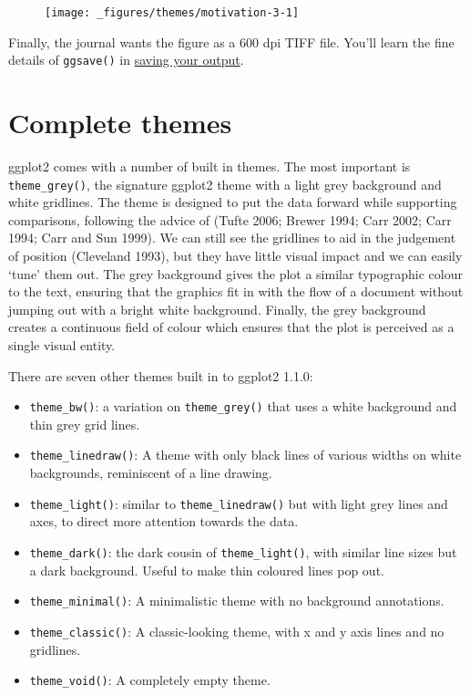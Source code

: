\begin{figure}[H]
  \centering
  \texttt{[image: \_figures/themes/motivation-3-1]}
\end{figure}

Finally, the journal wants the figure as a 600 dpi TIFF file. You'll
learn the fine details of \texttt{ggsave()} in
\hyperref[sec:saving]{saving your output}.

\section{Complete themes}\label{sec:themes}

ggplot2 comes with a number of built in themes. The most important is
\texttt{theme\_grey()}, the signature ggplot2 theme with a light grey
background and white gridlines. The theme is designed to put the data
forward while supporting comparisons, following the advice of (Tufte
2006; Brewer 1994; Carr 2002; Carr 1994; Carr and Sun 1999). We can
still see the gridlines to aid in the judgement of position (Cleveland
1993), but they have little visual impact and we can easily `tune' them
out. The grey background gives the plot a similar typographic colour to
the text, ensuring that the graphics fit in with the flow of a document
without jumping out with a bright white background. Finally, the grey
background creates a continuous field of colour which ensures that the
plot is perceived as a single visual entity. 

There are seven other themes built in to ggplot2 1.1.0:

\begin{itemize}
\item
  \texttt{theme\_bw()}: a variation on \texttt{theme\_grey()} that uses
  a white background and thin grey grid lines. 
\item
  \texttt{theme\_linedraw()}: A theme with only black lines of various
  widths on white backgrounds, reminiscent of a line drawing.
\item
  \texttt{theme\_light()}: similar to \texttt{theme\_linedraw()} but
  with light grey lines and axes, to direct more attention towards the
  data. 
\item
  \texttt{theme\_dark()}: the dark cousin of \texttt{theme\_light()},
  with similar line sizes but a dark background. Useful to make thin
  coloured lines pop out. 
\item
  \texttt{theme\_minimal()}: A minimalistic theme with no background
  annotations. 
\item
  \texttt{theme\_classic()}: A classic-looking theme, with x and y axis
  lines and no gridlines. 
\item
  \texttt{theme\_void()}: A completely empty theme. 
\end{itemize}

